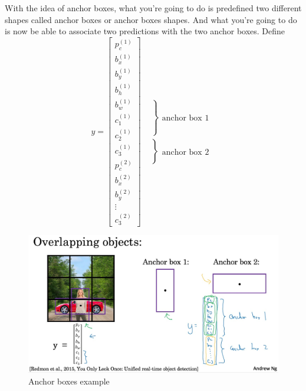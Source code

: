 \documentclass[UTF8]{article}
\newcommand{\Vector}[1]{\boldsymbol{\mathit{#1}}}   %
\begin{document}
With the idea of anchor boxes, what you're going to do is predefined two different shapes called
anchor boxes or anchor boxes shapes. And what you're going to do is now be able to associate two
predictions with the two anchor boxes. Define
$$ \Vector{y} = \left[\begin{array}{c} p_c^{(1)} \\ b_x^{(1)} \\ b_y^{(1)} \\ b_h^{(1)} \\ b_w^{(1)}
\\ c_1^{(1)} \\ c_2^{(1)} \\ c_3^{(1)} \\ p_c^{(2)} \\ b_x^{(2)} \\ b_y^{(2)} \\ \vdots \\ c_3^{(2)}
\end{array}\right]
\begin{array}{llll} \left.\begin{array}{c} \\ \\ \\ \\ \\ \\ \\ \\ \\ \end{array}\right\}
\begin{array}{c}\text{anchor box 1}\end{array} \\
\left.\begin{array}{c} \\ \\ \\ \\ \\ \\ \end{array}\right\}
\begin{array}{c}\text{anchor box 2}\end{array} \end{array} $$

\begin{figure}[htb]
    \centering
    \includegraphics[width=40em]{figures/anchor-boxes-example}
    \caption{Anchor boxes example}
    \label{fig:anchor-boxes-example}
\end{figure}
\end{document}
